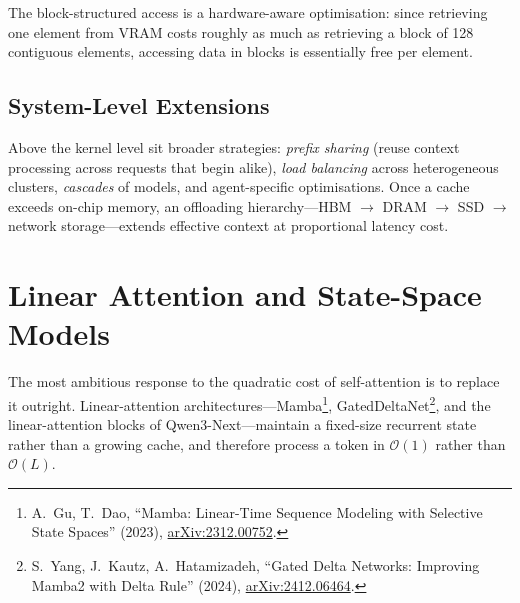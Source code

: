 \documentclass[11pt,a4paper]{article}
\theoremstyle{definition}
\theoremstyle{remark}
\theoremstyle{plain}
\newcommand{\bigO}{\mathcal{O}}
\newcommand{\arxivlink}[1]{\href{https://arxiv.org/abs/#1}{arXiv:#1}}
\begin{document}
\begin{center}
\end{center}

The block-structured access is a hardware-aware optimisation: since
retrieving one element from VRAM costs roughly as much as retrieving a
block of 128 contiguous elements, accessing data in blocks is essentially
free per element.

\subsection{System-Level Extensions}

Above the kernel level sit broader strategies: \emph{prefix sharing}
(reuse context processing across requests that begin alike), \emph{load
balancing} across heterogeneous clusters, \emph{cascades} of models, and
agent-specific optimisations. Once a cache exceeds on-chip memory, an
offloading hierarchy---HBM $\to$ DRAM $\to$ SSD $\to$ network
storage---extends effective context at proportional latency cost.

\section{Linear Attention and State-Space Models}
\label{sec:linear}

The most ambitious response to the quadratic cost of self-attention is to
replace it outright. Linear-attention architectures---Mamba\footnote{A.\
Gu, T.\ Dao, ``Mamba: Linear-Time Sequence Modeling with Selective State
Spaces'' (2023), \arxivlink{2312.00752}.}, GatedDeltaNet\footnote{S.\
Yang, J.\ Kautz, A.\ Hatamizadeh, ``Gated Delta Networks: Improving Mamba2
with Delta Rule'' (2024), \arxivlink{2412.06464}.}, and the
linear-attention blocks of Qwen3-Next---maintain a fixed-size recurrent
state rather than a growing cache, and therefore process a token in
$\bigO(1)$ rather than $\bigO(L)$.
\end{document}
